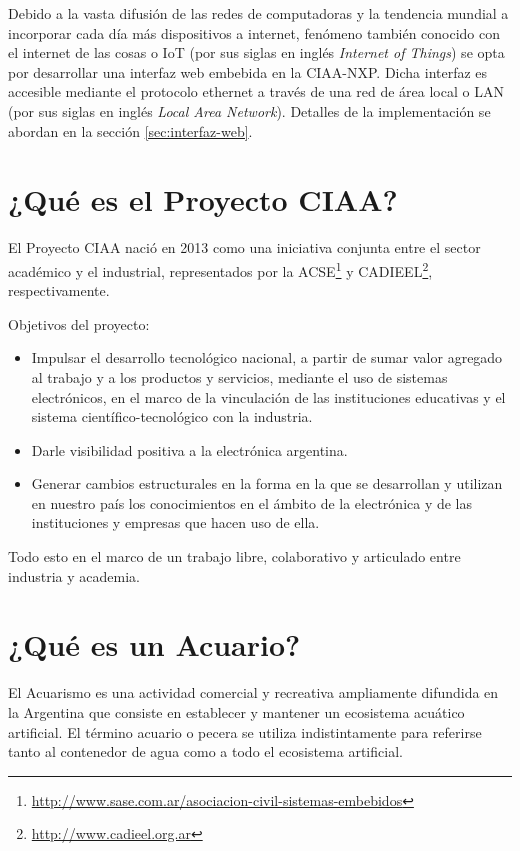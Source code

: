 Debido a la vasta difusión de las redes de computadoras y la tendencia mundial a incorporar cada día más dispositivos a internet, fenómeno también conocido con el internet de las cosas o IoT (por sus siglas en inglés \textit{Internet of Things}) se opta por desarrollar una interfaz web embebida en la CIAA-NXP.  Dicha interfaz es accesible mediante el protocolo ethernet a través de una red de área local o LAN (por sus siglas en inglés \textit{Local Area Network}). Detalles de la implementación se abordan en la sección \ref{sec:interfaz-web}.


\section{¿Qué es el Proyecto CIAA?}
\label{sec:proyecto-ciaa}

El Proyecto CIAA nació en 2013 como una iniciativa conjunta entre el sector académico y el industrial, representados por la ACSE\footnote{\url{http://www.sase.com.ar/asociacion-civil-sistemas-embebidos}} y CADIEEL\footnote{\url{http://www.cadieel.org.ar}}, respectivamente.

Objetivos del proyecto:

\begin{itemize}
	\item Impulsar el desarrollo tecnológico nacional, a partir de sumar valor agregado al trabajo y a los productos y servicios, mediante el uso de sistemas electrónicos, en el marco de la vinculación de las instituciones educativas y el sistema científico-tecnológico con la industria.
	\item Darle visibilidad positiva a la electrónica argentina.
	\item Generar cambios estructurales en la forma en la que se desarrollan y utilizan en nuestro país los conocimientos en el ámbito de la electrónica y de las instituciones y empresas que hacen uso de ella.
\end{itemize}

Todo esto en el marco de un trabajo libre, colaborativo y articulado entre industria y academia. 


\section{¿Qué es un Acuario?}
\label{sec:acuario}

El Acuarismo es una actividad comercial y recreativa ampliamente difundida en la Argentina que consiste en establecer y mantener un ecosistema acuático artificial. El término acuario o pecera se utiliza indistintamente para referirse tanto al contenedor de agua como a todo el ecosistema artificial. 


